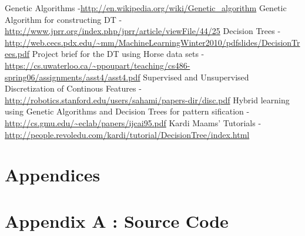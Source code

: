 \documentclass[12pt]{report}
\begin{document}
\newpage

\begin{thebibliography}{refs}
Genetic Algorithms  -\url{http://en.wikipedia.org/wiki/Genetic_algorithm}
Genetic Algorithm for constructing DT - \url{http://www.jprr.org/index.php/jprr/article/viewFile/44/25}
Decision Trees - \url{http://web.cecs.pdx.edu/~mm/MachineLearningWinter2010/pdfslides/DecisionTrees.pdf}
 Project brief for the DT  using Horse data sets  - \url{https://cs.uwaterloo.ca/~ppoupart/teaching/cs486-spring06/assignments/asst4/asst4.pdf}
Supervised and Unsupervised Discretization of Continous Features - \url{http://robotics.stanford.edu/users/sahami/papers-dir/disc.pdf}
Hybrid learning using Genetic Algorithms and Decision Trees for pattern sification - \url{http://cs.gmu.edu/~eclab/papers/ijcai95.pdf}
Kardi Maams' Tutorials - \url{http://people.revoledu.com/kardi/tutorial/DecisionTree/index.html}

\end{thebibliography}

\newpage
\pagestyle{fancy}
\chead{}
\rfoot{\small{\thepage}}
\renewcommand{\headrulewidth}{0.4pt}
\renewcommand{\footrulewidth}{0.4pt}

\section*{Appendices}
\section*{Appendix A : Source Code}
%
%
%
%
%
%
%
%
%
%
%
\end{document}
